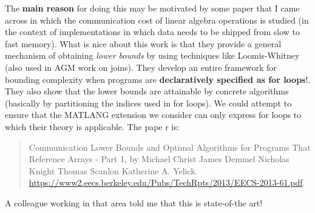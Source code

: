 The {\bf main reason} for doing this may be motivated by some paper that I came across in which the communication cost of linear algebra operations is studied (in the context of implementations in which data needs to be shipped from slow  to fast memory). What is nice about this work is that they provide a general mechanism of obtaining {\em lower bounds} by using techniques like  Loomis-Whitney (also used in AGM work on joins). They develop an entire framework for bounding complexity when programs are {\bf declaratively specified as for loops}!. They also show that the lower bounds are attainable by concrete algorithms (basically by partitioning the indices used in for loops). We could attempt to ensure that the MATLANG extension we consider can only express for loops to which their theory is applicable. The pape r is:
\begin{quote}
Communication Lower Bounds and Optimal Algorithms for Programs That Reference Arrays - Part 1, by Michael Christ James Demmel Nicholas Knight Thomas Scanlon Katherine A. Yelick. \url{https://www2.eecs.berkeley.edu/Pubs/TechRpts/2013/EECS-2013-61.pdf}.
\end{quote}
A colleague working in that area told me that this is state-of-the art!




